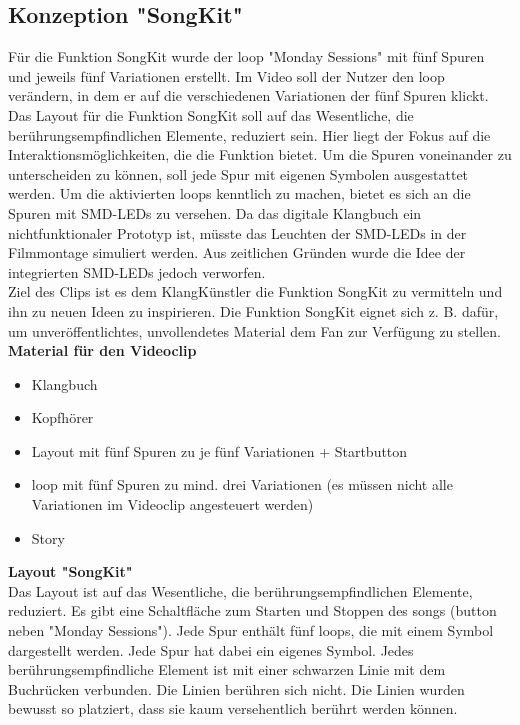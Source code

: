 \vspace{0.5cm}






\subsection{Konzeption "SongKit"}
Für die Funktion SongKit wurde der \gls{loop} "Monday Sessions" mit fünf Spuren und jeweils fünf Variationen erstellt. Im Video soll der Nutzer den \gls{loop} verändern, in dem er auf die verschiedenen Variationen der fünf Spuren klickt.\\

Das Layout für die Funktion SongKit soll auf das Wesentliche, die berührungsempfindlichen Elemente, reduziert sein. Hier liegt der Fokus auf die Interaktionsmöglichkeiten, die die Funktion bietet. Um die Spuren voneinander zu unterscheiden zu können, soll jede Spur mit eigenen Symbolen ausgestattet werden. Um die aktivierten \gls{loop}s kenntlich zu machen, bietet es sich an die Spuren mit SMD-LEDs zu versehen. Da das digitale Klangbuch ein nichtfunktionaler Prototyp ist, müsste das Leuchten der SMD-LEDs in der Filmmontage simuliert werden. Aus zeitlichen Gründen wurde die Idee der integrierten SMD-LEDs jedoch verworfen.\\

Ziel des Clips ist es dem KlangKünstler die Funktion SongKit zu vermitteln und ihn zu neuen Ideen zu inspirieren. Die Funktion SongKit eignet sich z. B. dafür, um unveröffentlichtes, unvollendetes Material dem Fan zur Verfügung zu stellen.\\


\textbf{Material für den Videoclip}
\begin{itemize}
\item Klangbuch
\item Kopfhörer
\item Layout mit fünf Spuren zu je fünf Variationen + Startbutton
\item \gls{loop} mit fünf Spuren zu mind. drei Variationen (es müssen nicht alle Variationen im Videoclip angesteuert werden)
\item Story
\end{itemize}

\vspace{0.5cm}



\textbf{Layout "SongKit"}\\
Das Layout ist auf das Wesentliche, die berührungsempfindlichen Elemente, reduziert. Es gibt eine Schaltfläche zum Starten und Stoppen des \gls{song}s (\gls{button} neben "Monday Sessions"). Jede Spur enthält fünf \gls{loop}s, die mit einem Symbol dargestellt werden. Jede Spur hat dabei ein eigenes Symbol. Jedes berührungsempfindliche Element ist mit einer schwarzen Linie mit dem Buchrücken verbunden. Die Linien berühren sich nicht. Die Linien wurden bewusst so platziert, dass sie kaum versehentlich berührt werden können.

